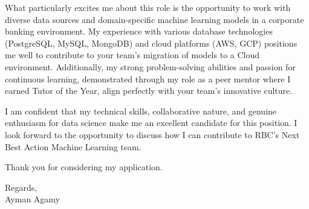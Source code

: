 \documentclass{article}
\begin{document}
	\vspace{1em}
	
	\noindent
	What particularly excites me about this role is the opportunity to work with diverse data sources and
	domain-specific machine learning models in a corporate banking environment. My experience with various database
	technologies (PostgreSQL, MySQL, MongoDB) and cloud platforms (AWS, GCP) positions me well to contribute to your
	team's migration of models to a Cloud environment. Additionally, my strong problem-solving abilities and
    passion for
	continuous learning, demonstrated through my role as a peer mentor where I earned Tutor of the Year, align
    perfectly
	with your team's innovative culture.
	
	\vspace{1em}
	
	\noindent
	I am confident that my technical skills, collaborative nature, and genuine enthusiasm for data science make me an
	excellent candidate for this position. I look forward to the opportunity to discuss how I can contribute to RBC's
	Next Best Action Machine Learning team.
	
	\vspace{1em}
	
	\noindent
	Thank you for considering my application.
	
	\vspace{1em}
	
	\noindent
	Regards, \\
	Ayman Agamy
\end{document}
